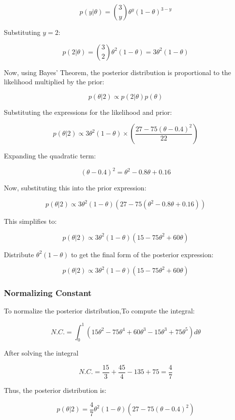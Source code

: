 \documentclass{article}
\begin{document}
\[
p(y | \theta) = \binom{3}{y} \theta^y (1 - \theta)^{3 - y}
\]

Substituting \( y = 2 \):

\[
p(2 | \theta) = \binom{3}{2} \theta^2 (1 - \theta) = 3 \theta^2 (1 - \theta)
\]

Now, using Bayes' Theorem, the posterior distribution is proportional to the likelihood multiplied by the prior:

\[
p(\theta | 2) \propto p(2 | \theta) p(\theta)
\]

Substituting the expressions for the likelihood and prior:

\[
p(\theta | 2) \propto 3 \theta^2 (1 - \theta) \times \left( \frac{27 - 75(\theta - 0.4)^2}{22} \right)
\]

Expanding the quadratic term:

\[
(\theta - 0.4)^2 = \theta^2 - 0.8\theta + 0.16
\]

Now, substituting this into the prior expression:

\[
p(\theta | 2) \propto 3 \theta^2 (1 - \theta) \left( 27 - 75(\theta^2 - 0.8 \theta + 0.16) \right)
\]

This simplifies to:

\[
p(\theta | 2) \propto 3 \theta^2 (1 - \theta) \left( 15 - 75\theta^2 + 60\theta \right)
\]

Distribute \( \theta^2 (1 - \theta) \) to get the final form of the posterior expression:

\[
p(\theta | 2) \propto 3 \theta^2 (1 - \theta) \left( 15 - 75 \theta^2 + 60 \theta \right)
\]

\subsubsection*{Normalizing Constant}

To normalize the posterior distribution,To compute the integral:

\[
N.C. = \int_0^1 \left( 15 \theta^2 - 75 \theta^4 + 60 \theta^3 - 15 \theta^3 + 75 \theta^5 \right) d\theta
\]

After solving the integral

\[
N.C. = \frac{15}{3} + \frac{45}{4} - 135 + 75 = \frac{4}{7}
\]

Thus, the posterior distribution is:

\[
p(\theta | 2) = \frac{4}{7} \theta^2 (1 - \theta) \left( 27 - 75 (\theta - 0.4)^2 \right)
\]

\end{document}
